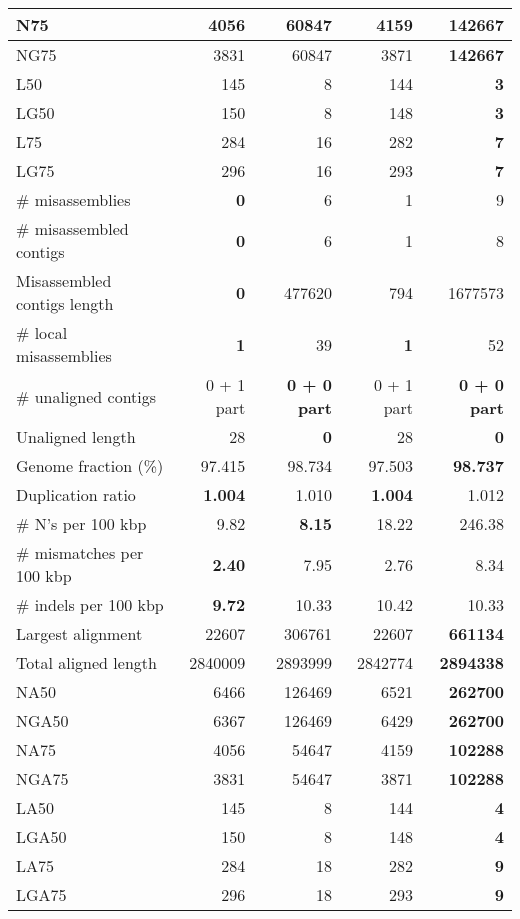 \documentclass[12pt,a4paper]{article}
\begin{document}
\begin{table}[ht]
\begin{center}
\begin{tabular}{|l*{4}{|r}|}
N75 & 4056 & 60847 & 4159 & {\bf 142667} \\ \hline
NG75 & 3831 & 60847 & 3871 & {\bf 142667} \\ \hline
L50 & 145 & 8 & 144 & {\bf 3} \\ \hline
LG50 & 150 & 8 & 148 & {\bf 3} \\ \hline
L75 & 284 & 16 & 282 & {\bf 7} \\ \hline
LG75 & 296 & 16 & 293 & {\bf 7} \\ \hline
\# misassemblies & {\bf 0} & 6 & 1 & 9 \\ \hline
\# misassembled contigs & {\bf 0} & 6 & 1 & 8 \\ \hline
Misassembled contigs length & {\bf 0} & 477620 & 794 & 1677573 \\ \hline
\# local misassemblies & {\bf 1} & 39 & {\bf 1} & 52 \\ \hline
\# unaligned contigs & 0 + 1 part & {\bf 0 + 0 part} & 0 + 1 part & {\bf 0 + 0 part} \\ \hline
Unaligned length & 28 & {\bf 0} & 28 & {\bf 0} \\ \hline
Genome fraction (\%) & 97.415 & 98.734 & 97.503 & {\bf 98.737} \\ \hline
Duplication ratio & {\bf 1.004} & 1.010 & {\bf 1.004} & 1.012 \\ \hline
\# N's per 100 kbp & 9.82 & {\bf 8.15} & 18.22 & 246.38 \\ \hline
\# mismatches per 100 kbp & {\bf 2.40} & 7.95 & 2.76 & 8.34 \\ \hline
\# indels per 100 kbp & {\bf 9.72} & 10.33 & 10.42 & 10.33 \\ \hline
Largest alignment & 22607 & 306761 & 22607 & {\bf 661134} \\ \hline
Total aligned length & 2840009 & 2893999 & 2842774 & {\bf 2894338} \\ \hline
NA50 & 6466 & 126469 & 6521 & {\bf 262700} \\ \hline
NGA50 & 6367 & 126469 & 6429 & {\bf 262700} \\ \hline
NA75 & 4056 & 54647 & 4159 & {\bf 102288} \\ \hline
NGA75 & 3831 & 54647 & 3871 & {\bf 102288} \\ \hline
LA50 & 145 & 8 & 144 & {\bf 4} \\ \hline
LGA50 & 150 & 8 & 148 & {\bf 4} \\ \hline
LA75 & 284 & 18 & 282 & {\bf 9} \\ \hline
LGA75 & 296 & 18 & 293 & {\bf 9} \\ \hline
\end{tabular}
\end{center}
\end{table}
\end{document}
